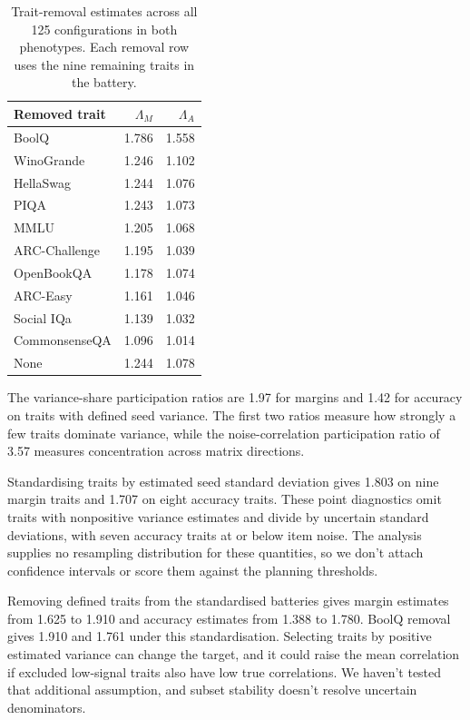 \begin{table}[!htb]
\centering
\caption{Trait-removal estimates across all 125 configurations in both phenotypes. Each removal row uses the nine remaining traits in the battery.}
\label{tab:original10}
\small\setlength{\tabcolsep}{4pt}\renewcommand{\arraystretch}{1.12}
\begin{tabular}{lrr}\toprule
Removed trait & $\Lambda_M$ & $\Lambda_A$\\\midrule
BoolQ & 1.786 & 1.558\\
WinoGrande & 1.246 & 1.102\\
HellaSwag & 1.244 & 1.076\\
PIQA & 1.243 & 1.073\\
MMLU & 1.205 & 1.068\\
ARC-Challenge & 1.195 & 1.039\\
OpenBookQA & 1.178 & 1.074\\
ARC-Easy & 1.161 & 1.046\\
Social IQa & 1.139 & 1.032\\
CommonsenseQA & 1.096 & 1.014\\
None & 1.244 & 1.078\\\bottomrule
\end{tabular}
\end{table}

The variance-share participation ratios are 1.97 for margins and 1.42 for accuracy on traits with defined seed variance. The first two ratios measure how strongly a few traits dominate variance, while the noise-correlation participation ratio of 3.57 measures concentration across matrix directions.

Standardising traits by estimated seed standard deviation gives 1.803 on nine margin traits and 1.707 on eight accuracy traits. These point diagnostics omit traits with nonpositive variance estimates and divide by uncertain standard deviations, with seven accuracy traits at or below item noise. The analysis supplies no resampling distribution for these quantities, so we don't attach confidence intervals or score them against the planning thresholds.

Removing defined traits from the standardised batteries gives margin estimates from 1.625 to 1.910 and accuracy estimates from 1.388 to 1.780. BoolQ removal gives 1.910 and 1.761 under this standardisation. Selecting traits by positive estimated variance can change the target, and it could raise the mean correlation if excluded low-signal traits also have low true correlations. We haven't tested that additional assumption, and subset stability doesn't resolve uncertain denominators.

